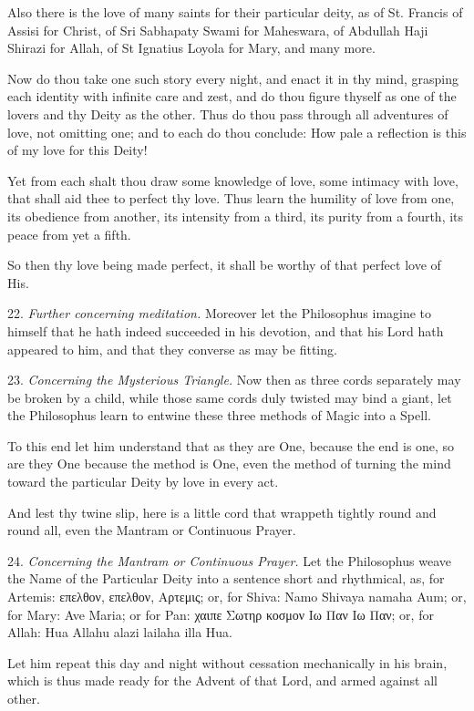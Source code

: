 Also there is the love of many saints for their particular deity, as of St. Francis of Assisi for Christ, of Sri Sabhapaty Swami for Maheswara, of Abdullah Haji Shirazi for Allah, of St Ignatius Loyola for Mary, and many more.

Now do thou take one such story every night, and enact it in thy mind, grasping each identity with infinite care and zest, and do thou figure thyself as one of the lovers and thy Deity as the other. Thus do thou pass through all adventures of love, not omitting one; and to each do thou conclude: How pale a reflection is this of my love for this Deity!

Yet from each shalt thou draw some knowledge of love, some intimacy with love, that shall aid thee to perfect thy love. Thus learn the humility of love from one, its obedience from another, its intensity from a third, its purity from a fourth, its peace from yet a fifth.

So then thy love being made perfect, it shall be worthy of that perfect love of His.

22. \textit{Further concerning meditation.} Moreover let the Philosophus imagine to himself that he hath indeed succeeded in his devotion, and that his Lord hath appeared to him, and that they converse as may be fitting.

23. \textit{Concerning the Mysterious Triangle.} Now then as three cords separately may be broken by a child, while those same cords duly twisted may bind a giant, let the Philosophus learn to entwine these three methods of Magic into a Spell.

To this end let him understand that as they are One, because the end is one, so are they One because the method is One, even the method of turning the mind toward the particular Deity by love in every act.

And lest thy twine slip, here is a little cord that wrappeth tightly round and round all, even the Mantram or Continuous Prayer.

24. \textit{Concerning the Mantram or Continuous Prayer.} Let the Philosophus weave the Name of the Particular Deity into a sentence short and rhythmical, as, for Artemis: \textgreek{επελθον}, \textgreek{επελθον}, \textgreek{Αρτεμις}; or, for Shiva: Namo Shivaya namaha Aum; or, for Mary: Ave Maria; or for Pan: \textgreek{χαιπε Σωτηρ κοσμον Ιω Παν Ιω Παν}; or, for Allah: Hua Allahu alazi lailaha illa Hua.

Let him repeat this day and night without cessation mechanically in his brain, which is thus made ready for the Advent of that Lord, and armed against all other.


